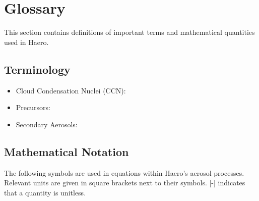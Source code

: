 \chapter{Glossary}

This section contains definitions of important terms and mathematical quantities
used in Haero.

\section{Terminology}

\begin{itemize}
  \item Cloud Condensation Nuclei (CCN):
  \item Precursors:
  \item Secondary Aerosols:
\end{itemize}

\section{Mathematical Notation}

The following symbols are used in equations within Haero's aerosol processes.
Relevant units are given in square brackets next to their symbols. [-] indicates
that a quantity is unitless.

